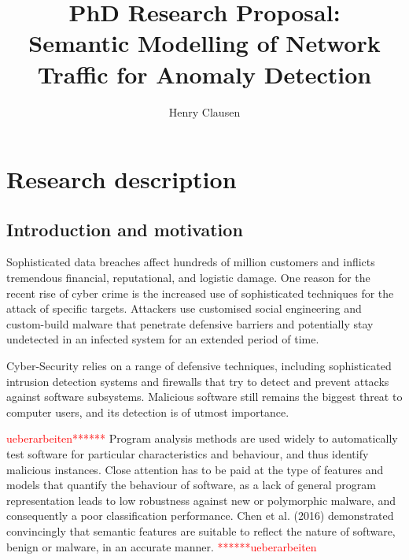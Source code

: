 \documentclass[a4paper,12pt,twoside]{report}
\makeatletter
\newcommand*{\toccontents}{\@starttoc{toc}}
\makeatother
\begin{document}
\title{\LARGE {\bf PhD Research Proposal:\\Semantic Modelling of Network Traffic for Anomaly Detection}\\
 \vspace*{-5mm}
}
\author{Henry Clausen}

\maketitle



\toccontents



\chapter{Research description}

\section{Introduction and motivation}



Sophisticated data breaches affect hundreds of million customers and inflicts tremendous financial, reputational, and logistic damage. One reason for the recent rise of cyber crime is the increased use of sophisticated techniques for the attack of specific targets. Attackers use customised social engineering and custom-build malware that penetrate defensive barriers and potentially stay undetected in an infected system for an extended period of time. 

Cyber-Security relies on a range of defensive techniques, including sophisticated intrusion detection systems and firewalls that try to detect and prevent attacks against software subsystems. Malicious software still remains the biggest threat to computer users, and its detection is of utmost importance. 


\textcolor{red}{ueberarbeiten******}
Program analysis methods are used widely to automatically test software for particular characteristics and behaviour, and thus identify malicious instances. Close attention has to be paid at the type of features and models that quantify the behaviour of software, as a lack of general program representation leads to low robustness against new or polymorphic malware, and consequently a poor classification performance.  Chen et al.  (2016) \cite{chen_2016_robust, chen_more_2016} demonstrated convincingly that semantic features are suitable to reflect the nature of software, benign or malware, in an accurate manner. \textcolor{red}{******ueberarbeiten}
\end{document}
